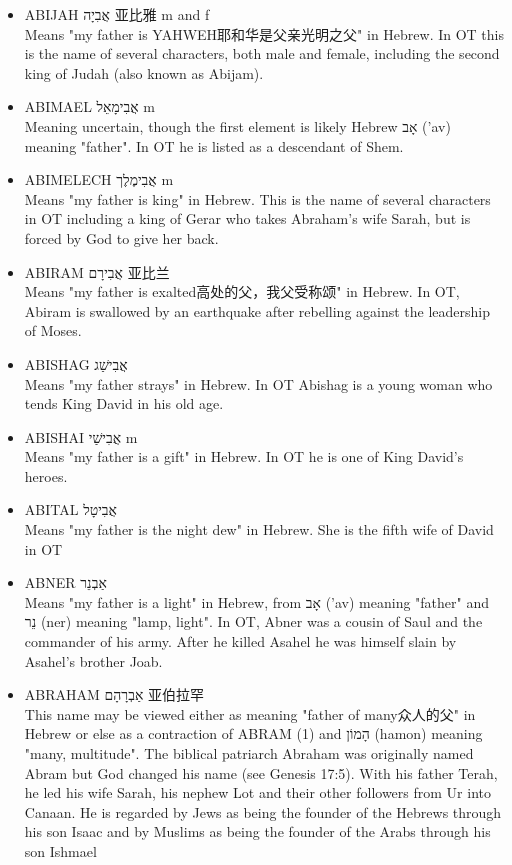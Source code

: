 \begin{itemize}
\item {ABIJAH אֲבִיָה 亚比雅 m and f}\\
Means "my father is YAHWEH耶和华是父亲光明之父" in Hebrew. In OT this is the name of several characters, both male and female, including the second king of Judah (also known as Abijam).
\item {ABIMAEL אֲבִימָאֵל m}\\
Meaning uncertain, though the first element is likely Hebrew אָב ('av) meaning "father". In OT he is listed as a descendant of Shem.
\item {ABIMELECH אֲבִימֶלֶך m}\\
Means "my father is king" in Hebrew. This is the name of several characters in OT including a king of Gerar who takes Abraham's wife Sarah, but is forced by God to give her back.
\item {ABIRAM אֲבִירָם 亚比兰}\\
Means "my father is exalted高处的父，我父受称颂" in Hebrew. In OT, Abiram is swallowed by an earthquake after rebelling against the leadership of Moses.
\item {ABISHAG אֲבִישַׁג }\\
Means "my father strays" in Hebrew. In OT Abishag is a young woman who tends King David in his old age.
\item {ABISHAI אֲבִישַׁי m}\\
Means "my father is a gift" in Hebrew. In OT he is one of King David's heroes.
\item {ABITAL אֲבִיטָל }\\
Means "my father is the night dew" in Hebrew. She is the fifth wife of David in OT
\item {ABNER אַבְנֵר }\\
Means "my father is a light" in Hebrew, from אָב ('av) meaning "father" and נֵר (ner) meaning "lamp, light". In OT, Abner was a cousin of Saul and the commander of his army. After he killed Asahel he was himself slain by Asahel's brother Joab. 
\item {ABRAHAM אַבְרָהָם 亚伯拉罕}\\
This name may be viewed either as meaning "father of many众人的父" in Hebrew or else as a contraction of ABRAM (1) and הָמוֹן (hamon) meaning "many, multitude". The biblical patriarch Abraham was originally named Abram but God changed his name (see Genesis 17:5). With his father Terah, he led his wife Sarah, his nephew Lot and their other followers from Ur into Canaan. He is regarded by Jews as being the founder of the Hebrews through his son Isaac and by Muslims as being the founder of the Arabs through his son Ishmael


\end{itemize}
